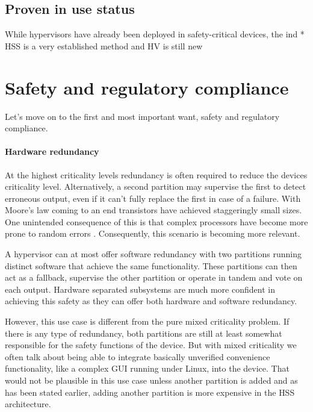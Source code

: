 \subsection{Proven in use status}
While hypervisors have already been deployed in safety-critical devices, the ind
* HSS is a very established method and HV is still new

\section{Safety and regulatory compliance}
 Let's move on to the first and most important want, safety and regulatory compliance. 
 \paragraph{Hardware redundancy}
 At the highest criticality levels redundancy is often required to reduce the devices criticality level. Alternatively, a second partition may supervise the first to detect erroneous output, even if it can't fully replace the first in case of a failure. With Moore's law coming to an end transistors have achieved staggeringly small sizes. One unintended consequence of this is that complex processors have become more prone to random errors \cite{Constantinescu.2003}. Consequently, this scenario is becoming more relevant.
 
 A hypervisor can at most offer software redundancy with two partitions running distinct software that achieve the same functionality. These partitions can then act as a fallback, supervise the other partition or operate in tandem and vote on each output. Hardware separated subsystems are much more confident in achieving this safety as they can offer both hardware and software redundancy. 
 
However, this use case is different from the pure mixed criticality problem. If there is any type of redundancy, both partitions are still at least somewhat responsible for the safety functions of the device. But with mixed criticality we often talk about being able to integrate basically unverified convenience functionality, like a complex GUI running under Linux, into the device. That would not be plausible in this use case unless another partition is added and as has been stated earlier, adding another partition is more expensive in the \gls{HSS} architecture.

